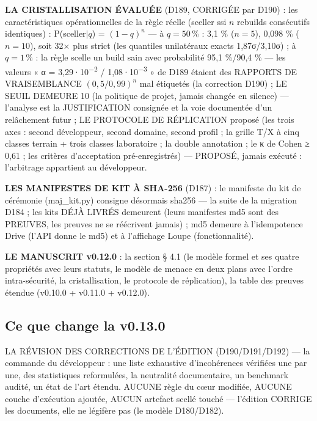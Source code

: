 \textbf{LA CRISTALLISATION ÉVALUÉE} (D189, CORRIGÉE par D190) : les
caractéristiques opérationnelles de la règle réelle (sceller ssi $n$
rebuilds consécutifs identiques) : P(sceller$|q$) = $(1-q)^n$ — à
$q = 50$\,\% : 3,1 \% ($n{=}5$), 0,098 \% ($n{=}10$), soit 32× plus
strict (les quantiles unilatéraux exacts 1,87σ/3,10σ) ; à $q = 1$\,\% :
la règle scelle un build sain avec probabilité 95,1 \%/90,4 \% — les
valeurs « α = 3,29·10\textsuperscript{−2} / 1,08·10\textsuperscript{−3} »
de D189 étaient des RAPPORTS DE VRAISEMBLANCE $(0,5/0,99)^n$ mal
étiquetés (la correction D190) ; LE SEUIL DEMEURE 10 (la politique de projet, jamais changée
en silence) — l'analyse est la JUSTIFICATION consignée et la voie
documentée d'un relâchement futur ; LE PROTOCOLE DE RÉPLICATION proposé
(les trois axes : second développeur, second domaine, second profil ;
la grille T/X à cinq classes terrain + trois classes laboratoire ; la
double annotation ; le κ de Cohen ≥ 0,61 ; les critères d'acceptation
pré-enregistrés) — PROPOSÉ, jamais exécuté : l'arbitrage appartient au
développeur.

\textbf{LES MANIFESTES DE KIT À SHA-256} (D187) : le manifeste du kit de
cérémonie (maj\_kit.py) consigne désormais sha256 — la suite de la
migration D184 ; les kits DÉJÀ LIVRÉS demeurent (leurs manifestes md5
sont des PREUVES, les preuves ne se réécrivent jamais) ; md5 demeure à
l'idempotence Drive (l'API donne le md5) et à l'affichage Loupe
(fonctionnalité).

\textbf{LE MANUSCRIT v0.12.0} : la section § 4.1 (le modèle formel et
ses quatre propriétés avec leurs statuts, le modèle de menace en deux
plans avec l'ordre intra-sécurité, la cristallisation, le protocole de
réplication), la table des preuves étendue (v0.10.0 + v0.11.0 + v0.12.0).

\subsection{Ce que change la v0.13.0}\label{sec:nouveautes130}

LA RÉVISION DES CORRECTIONS DE L'ÉDITION (D190/D191/D192) — la commande du
développeur : une liste exhaustive d'incohérences vérifiées une par une, des
statistiques reformulées, la neutralité documentaire, un benchmark audité, un
état de l'art étendu. AUCUNE règle du cœur modifiée, AUCUNE couche d'exécution
ajoutée, AUCUN artefact scellé touché — l'édition CORRIGE les documents, elle
ne légifère pas (le modèle D180/D182).

